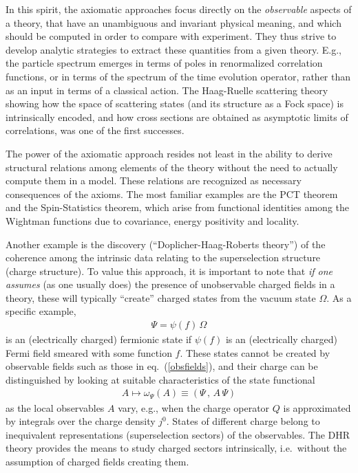 \documentclass[multphys,vecphys]{svmult}
\newcommand{\bea}{\begin{eqnarray}}
\newcommand{\eea}{\end{eqnarray}}
\begin{document}
In this spirit, the axiomatic approaches
focus directly on the {\em observable} aspects of a theory, that have
an unambiguous and invariant physical meaning, and which should be
computed in order to compare with experiment. They thus strive to
develop analytic strategies to extract these quantities from a given
theory. E.g., the particle spectrum emerges in terms
of poles in renormalized correlation functions,
or in terms of the spectrum of the time evolution operator, rather
than as an input in terms of a classical action. The
Haag-Ruelle scattering
theory showing how the space of scattering states
(and its structure as a Fock space) is intrinsically encoded, and how
cross sections are obtained as asymptotic limits
of correlations, was one of the first successes.    

The power of the axiomatic approach resides
not least in the ability to derive structural relations among elements
of the theory without the need to actually compute them in a
model. These relations are recognized as necessary consequences of the
axioms. The most familiar examples are the PCT theorem and the
Spin-Statistics theorem, which arise from functional identities among
the Wightman functions due to covariance, energy
positivity and locality.  

Another example is the discovery
(``Doplicher-Haag-Roberts
theory'') of the coherence among the intrinsic data relating to the
superselection structure (charge
structure). To value this approach, it is important to note that {\em
  if one assumes} (as one usually does) the presence of unobservable
charged fields in a theory, these will typically ``create'' charged
states from the vacuum state $\Omega$. As a specific example,  
\bea 
  \Psi = \psi(f)\,\Omega 
\eea
is an (electrically charged) fermionic state if $\psi(f)$ is an
(electrically charged) Fermi field smeared with some function $f$. 
These states cannot be created by observable fields such as those in
eq.~(\ref{obsfields}), and their charge can be distinguished by 
looking at suitable characteristics of the state functional 
\bea 
  A \mapsto \omega_\Psi(A) \equiv (\Psi\,,\,A\,\Psi) 
\eea 
as the local observables $A$ vary, e.g., when the charge operator $Q$
is approximated by integrals over the charge density $j^0$. 
States of different charge belong to inequivalent representations
(superselection sectors) of the
observables. The DHR theory
provides the means to study charged sectors intrinsically, i.e.\
without the assumption of charged fields creating them.
\end{document}
